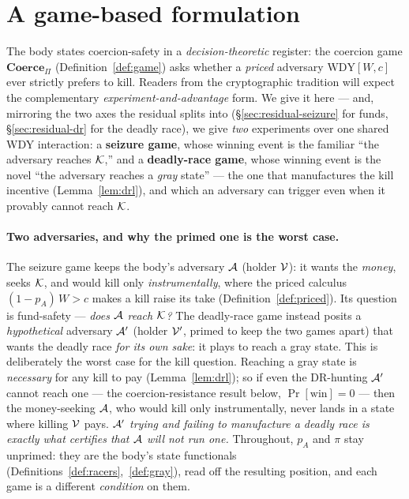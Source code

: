 \section{A game-based formulation}
\label{app:game}

\newcommand{\DRExp}{\mathsf{DR}\text{-}\mathsf{Exp}}
\newcommand{\SzExp}{\mathsf{Sz}\text{-}\mathsf{Exp}}

The body states coercion-safety in a \emph{decision-theoretic} register: the
coercion game $\mathbf{Coerce}_{\Pi}$ (Definition~\ref{def:game}) asks whether a
\emph{priced} adversary $\mathrm{WDY}[W,c]$ ever strictly prefers to kill. Readers
from the cryptographic tradition will expect the complementary
\emph{experiment-and-advantage} form. We give it here --- and, mirroring the two
axes the residual splits into (\S\ref{sec:residual-seizure} for funds,
\S\ref{sec:residual-dr} for the deadly race), we give \emph{two} experiments over
one shared WDY interaction: a \textbf{seizure game}, whose winning event is the
familiar ``the adversary reaches $\mathcal{K}$,'' and a \textbf{deadly-race game}, whose
winning event is the novel ``the adversary reaches a \emph{gray} state'' --- the one
that manufactures the kill incentive (Lemma~\ref{lem:drl}), and which an adversary
can trigger even when it provably cannot reach $\mathcal{K}$.

\paragraph{Two adversaries, and why the primed one is the worst case.}
The seizure game keeps the body's adversary $\mathcal{A}$ (holder $\mathcal{V}$): it wants
the \emph{money}, seeks $\mathcal{K}$, and would kill only \emph{instrumentally}, where the
priced calculus $(1-p_A)\,W>c$ makes a kill raise its take
(Definition~\ref{def:priced}). Its question is fund-safety --- \emph{does $\mathcal{A}$
reach $\mathcal{K}$?} The deadly-race game instead posits a \emph{hypothetical} adversary
$\mathcal{A}'$ (holder $\mathcal{V}'$, primed to keep the two games apart) that wants the
deadly race \emph{for its own sake}: it plays to reach a gray state. This is
deliberately the worst case for the kill question. Reaching a gray state is
\emph{necessary} for any kill to pay (Lemma~\ref{lem:drl}); so if even the
DR-hunting $\mathcal{A}'$ cannot reach one --- the coercion-resistance result below,
$\Pr[\text{win}]=0$ --- then the money-seeking $\mathcal{A}$, who would kill only
instrumentally, never lands in a state where killing $\mathcal{V}$ pays.
\emph{$\mathcal{A}'$ trying and failing to manufacture a deadly race is exactly what
certifies that $\mathcal{A}$ will not run one.} Throughout, $p_A$ and $\pi$ stay
unprimed: they are the body's state functionals
(Definitions~\ref{def:racers},~\ref{def:gray}), read off the resulting position, and
each game is a different \emph{condition} on them.

